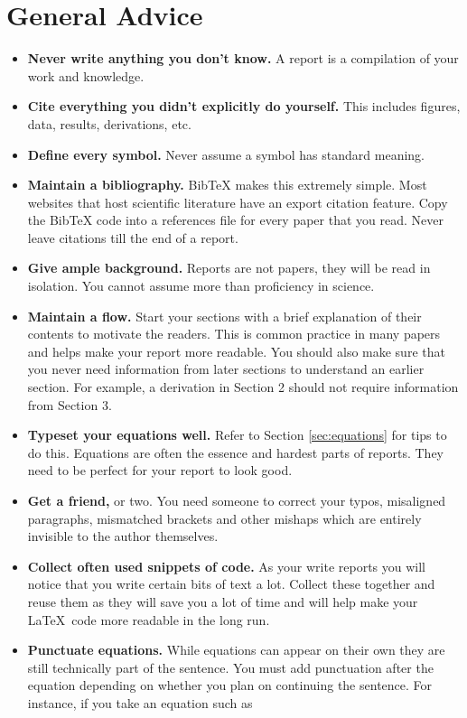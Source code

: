 \section{General Advice}
\begin{itemize}
	\item \textbf{Never write anything you don't know.} A report is a compilation of your work and knowledge.
	\item \textbf{Cite everything you didn't explicitly do yourself.} This includes figures, data, results, derivations, etc.
	\item \textbf{Define every symbol.} Never assume a symbol has standard meaning.
	\item \textbf{Maintain a bibliography.} BibTeX makes this extremely simple. Most websites that host scientific literature have an export citation feature. Copy the BibTeX code into a references file for every paper that you read. Never leave citations till the end of a report.
	\item \textbf{Give ample background.} Reports are not papers, they will be read in isolation. You cannot assume more than proficiency in science.
	\item \textbf{Maintain a flow.} Start your sections with a brief explanation of their contents to motivate the readers. This is common practice in many papers and helps make your report more readable. You should also make sure that you never need information from later sections to understand an earlier section. For example, a derivation in Section 2 should not require information from Section 3.
	\item \textbf{Typeset your equations well.} Refer to Section \ref{sec:equations} for tips to do this. Equations are often the essence and hardest parts of reports. They need to be perfect for your report to look good.
	\item \textbf{Get a friend,} or two. You need someone to correct your typos, misaligned paragraphs, mismatched brackets and other mishaps which are entirely invisible to the author themselves.
	\item \textbf{Collect often used snippets of code.} As your write reports you will notice that you write certain bits of text a lot. Collect these together and reuse them as they will save you a lot of time and will help make your \LaTeX\ code more readable in the long run.
	\item \textbf{Punctuate equations.}
	While equations can appear on their own they are still technically part of the sentence. You must add punctuation after the equation depending on whether you plan on continuing the sentence. For instance, if you take an equation such as

\end{itemize}
